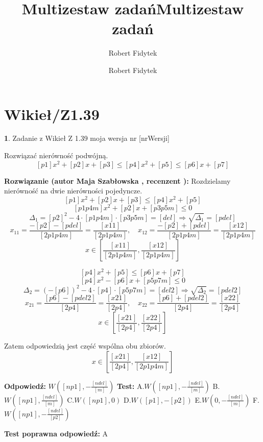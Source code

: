 \documentclass[12pt, a4paper]{article}
\title{Multizestaw zadań}
\author{Robert Fidytek}
\date{}\documentclass[12pt, a4paper]{article}
\title{Multizestaw zadań}
\author{Robert Fidytek}
\date{}
\theoremstyle{definition} %
\newtheorem{zad}{}
\theoremstyle{definition} %
\newtheorem{zad}{}
\newcommand{\kategoria}[1]{\section{#1}} %
\newcommand{\zadStart}[1]{\begin{zad}#1\newline} %
\newcommand{\zadStop}{\end{zad}}   %
\newcommand{\rozwStart}[2]{\noindent \textbf{Rozwiązanie (autor #1 , recenzent #2): }\newline} %
\newcommand{\rozwStop}{\newline}                                            %
\newcommand{\odpStart}{\noindent \textbf{Odpowiedź:}\newline}    %
\newcommand{\odpStop}{\newline}                                             %
\newcommand{\testStart}{\noindent \textbf{Test:}\newline} %
\newcommand{\testStop}{\newline} %
\newcommand{\kluczStart}{\noindent \textbf{Test poprawna odpowiedź:}\newline} %
\newcommand{\kluczStop}{\newline} %
\begin{document}
\maketitle


\kategoria{Wikieł/Z1.39}
\zadStart{Zadanie z Wikieł Z 1.39 moja wersja nr [nrWersji]}

Rozwiązać nierówność podwójną.
$$[p1]x^{2}+[p2]x+[p3]\leq [p4]x^{2}+[p5] \leq [p6]x+[p7]$$
\zadStop

\rozwStart{Maja Szabłowska}{}
Rozdzielamy nierówność na dwie nierówności pojedyncze.
$$[p1]x^{2}+[p2]x+[p3]\leq [p4]x^{2}+[p5] $$
$$[p1p4m]x^{2}+[p2]x+[p3p5m]\leq0$$
$$\Delta_{1}=[p2]^{2}-4\cdot[p1p4m]\cdot[p3p5m]=[del] \Rightarrow \sqrt{\Delta_{1}}=[pdel]$$
$$x_{11}=\frac{-[p2]-[pdel]}{[2p1p4m]}=\frac{[x11]}{[2p1p4m]}, \quad x_{12}=\frac{-[p2]+[pdel]}{[2p1p4m]}=\frac{[x12]}{[2p1p4m]}$$
$$x\in\left[\frac{[x11]}{[2p1p4m]},\frac{[x12]}{[2p1p4m]}\right]$$

$$[p4]x^{2}+[p5] \leq [p6]x+[p7]$$
$$[p4]x^{2}-[p6]x+[p5p7m]\leq0$$
$$\Delta_{2}=(-[p6])^{2}-4\cdot[p4]\cdot[p5p7m]=[del2] \Rightarrow \sqrt{\Delta_{2}}=[pdel2]$$
$$x_{21}=\frac{[p6]-[pdel2]}{[2p4]}=\frac{[x21]}{[2p4]}, \quad x_{22}=\frac{[p6]+[pdel2]}{[2p4]}=\frac{[x22]}{[2p4]}$$
$$x\in\left[\frac{[x21]}{[2p4]}, \frac{[x22]}{[2p4]}\right]$$

Zatem odpowiedzią jest część wspólna obu zbiorów.
$$x\in\left[\frac{[x21]}{[2p4]},\frac{[x12]}{[2p1p4m]}\right]$$
\rozwStop


\odpStart
$W([np1],-\frac{[ndel]}{[m]})$
\odpStop
\testStart
A.$W([np1],-\frac{[ndel]}{[m]})$
B.$W([np1],\frac{[ndel]}{[m]})$
C.$W([np1],0)$
D.$W([p1],-[p2])$
E.$W(0,-\frac{[ndel]}{[m]})$
F.$W([np1],-\frac{[ndel]}{[p2]})$


\testStop
\kluczStart
A
\kluczStop
\end{document}
